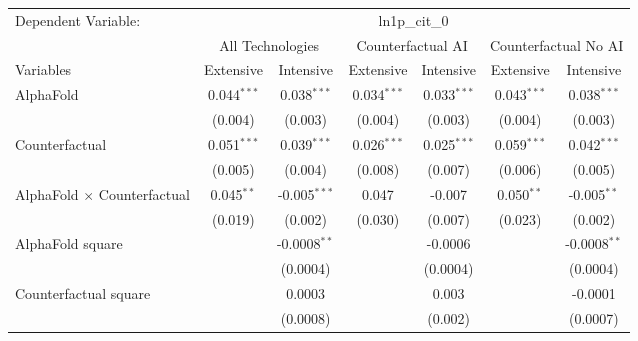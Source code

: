 \begingroup
\centering
\begin{tabular}{lcccccc}
   \tabularnewline \midrule \midrule
   Dependent Variable: & \multicolumn{6}{c}{ln1p\_cit\_0}\\
 & \multicolumn{2}{c}{All Technologies} & \multicolumn{2}{c}{Counterfactual AI} & \multicolumn{2}{c}{Counterfactual No AI} \\
\cmidrule(lr){1-1}\cmidrule(lr){2-3} \cmidrule(lr){4-5} \cmidrule(lr){6-7}
Variables & \multicolumn{1}{c}{Extensive} & \multicolumn{1}{c}{Intensive} & \multicolumn{1}{c}{Extensive} & \multicolumn{1}{c}{Intensive} & \multicolumn{1}{c}{Extensive} & \multicolumn{1}{c}{Intensive} \\
\cmidrule(lr){1-1}\cmidrule(lr){2-2} \cmidrule(lr){3-3} \cmidrule(lr){4-4} \cmidrule(lr){5-5} \cmidrule(lr){6-6} \cmidrule(lr){7-7}
   AlphaFold                          & 0.044$^{***}$ & 0.038$^{***}$  & 0.034$^{***}$ & 0.033$^{***}$ & 0.043$^{***}$ & 0.038$^{***}$\\   
                                      & (0.004)       & (0.003)        & (0.004)       & (0.003)       & (0.004)       & (0.003)\\   
   Counterfactual                     & 0.051$^{***}$ & 0.039$^{***}$  & 0.026$^{***}$ & 0.025$^{***}$ & 0.059$^{***}$ & 0.042$^{***}$\\   
                                      & (0.005)       & (0.004)        & (0.008)       & (0.007)       & (0.006)       & (0.005)\\   
   AlphaFold $\times$ Counterfactual  & 0.045$^{**}$  & -0.005$^{***}$ & 0.047         & -0.007        & 0.050$^{**}$  & -0.005$^{**}$\\   
                                      & (0.019)       & (0.002)        & (0.030)       & (0.007)       & (0.023)       & (0.002)\\   
   AlphaFold square                   &               & -0.0008$^{**}$ &               & -0.0006       &               & -0.0008$^{**}$\\   
                                      &               & (0.0004)       &               & (0.0004)      &               & (0.0004)\\   
   Counterfactual square              &               & 0.0003         &               & 0.003         &               & -0.0001\\   
                                      &               & (0.0008)       &               & (0.002)       &               & (0.0007)\\   

\end{tabular}
